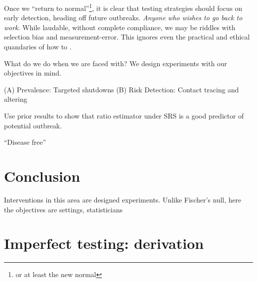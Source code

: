 \documentclass[11pt]{article}
\numberwithin{equation}{section}
\theoremstyle{plain}
\begin{document}
Once we ``return to normal''\footnote{or at least the new normal}, it is clear that testing strategies should focus on early detection, heading off future outbreaks.
\emph{Anyone who wishes to go back to work}.  While laudable, without complete compliance, we may be riddles with selection bias and measurement-error.  This ignores even the practical and ethical quandaries of how to .

What do we do when we are faced with?  We design experiments with our objectives in mind.

(A) Prevalence: Targeted shutdowns
(B) Risk Detection: Contact tracing and altering

Use prior results to show that ratio estimator under SRS is a good predictor of potential outbreak.

``Disease free''


\section{Conclusion}

Interventions in this area are designed experiments.  Unlike Fischer's null, here the objectives are settings, statisticians

\appendix

\section{Imperfect testing: derivation}
\end{document}

